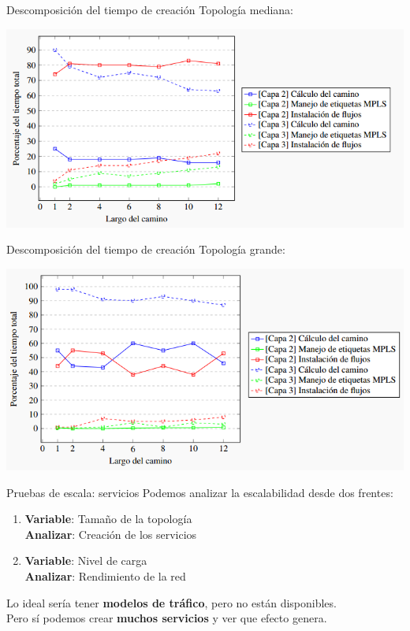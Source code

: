 \documentclass[xcolor=svgnames]{beamer}
\begin{document}
\begin{frame}{Descomposición del tiempo de creación}
	Topología mediana:
	\begin{center}
		\includegraphics[scale=0.6]{porcentajes_tiempos_mediana}
	\end{center}
\end{frame}

\begin{frame}{Descomposición del tiempo de creación}
	Topología grande:
	\begin{center}
		\includegraphics[scale=0.6]{porcentajes_tiempos_grande}
	\end{center}
\end{frame}

\begin{frame}{Pruebas de escala: servicios}
	Podemos analizar la escalabilidad desde dos frentes:
	\begin{enumerate}
		\item {\color{gray}\textbf{Variable}: Tamaño de la topología \\
		\textbf{Analizar}: Creación de los servicios}
		\item {\textbf{Variable}: Nivel de carga \\
		\textbf{Analizar}: Rendimiento de la red \\}
	\end{enumerate}
	\pause
	Lo ideal sería tener \textbf{modelos de tráfico}, pero no están disponibles. \\
	\pause
	Pero sí podemos crear \textbf{muchos servicios} y ver que efecto genera.
\end{frame}
\end{document}
